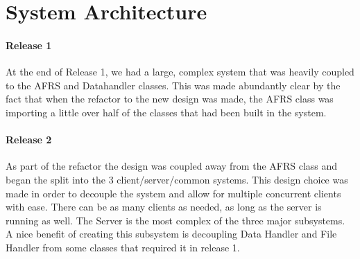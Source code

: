 \documentclass[12pt]{report}
\begin{document}
    \section*{System Architecture}\label{sec:systemArchitecture}

    \paragraph{Release 1}

    \indent
    At the end of Release 1, we had a large, complex system that was heavily coupled to the AFRS and Datahandler classes.
    This was made abundantly clear by the fact that when the refactor to the new design was made, the AFRS class was importing a little over half of the classes that had been built in the system.

    \begin{center}
    \end{center}

    \newpage

    \paragraph{Release 2}

    \indent
    As part of the refactor the design was coupled away from the AFRS class and began the split into the 3 client/server/common systems.
    This design choice was made in order to decouple the system and allow for multiple concurrent clients with ease.
    There can be as many clients as needed, as long as the server is running as well.
    The Server is the most complex of the three major subsystems.
    A nice benefit of creating this subsystem is decoupling Data Handler and File Handler from some classes that required it in release 1.
\end{document}
